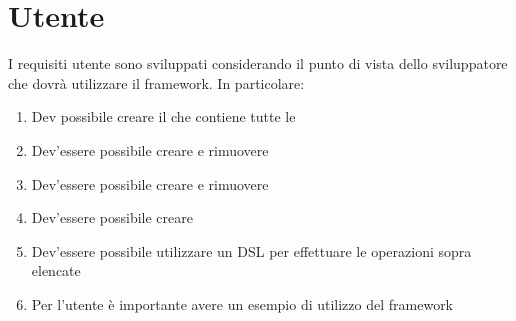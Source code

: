 \section{Utente}\label{sec:utente}
I requisiti utente sono sviluppati considerando il punto di vista dello sviluppatore che dovrà utilizzare il framework.
In particolare:
\begin{enumerate}[label=\textbf{\ref{sec:utente}.\arabic*}]
    \item \label{itm:u1} Dev possibile creare il \World che contiene tutte le \Entity
    \item \label{itm:u2} Dev'essere possibile creare e rimuovere \Component
    \item \label{itm:u3} Dev'essere possibile creare e rimuovere \Entity
    \item \label{itm:u4} Dev'essere possibile creare \System
    \item \label{itm:u5} Dev'essere possibile utilizzare un DSL per effettuare le operazioni sopra elencate
    \item \label{itm:u6} Per l'utente è importante avere un esempio di utilizzo del framework
\end{enumerate}

